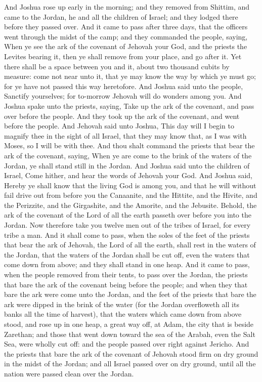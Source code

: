 And Joshua rose up early in the morning; and they removed from Shittim, and came to the Jordan, he and all the children of Israel; and they lodged there before they passed over. And it came to pass after three days, that the officers went through the midst of the camp; and they commanded the people, saying, When ye see the ark of the covenant of Jehovah your God, and the priests the Levites bearing it, then ye shall remove from your place, and go after it. Yet there shall be a space between you and it, about two thousand cubits by measure: come not near unto it, that ye may know the way by which ye must go; for ye have not passed this way heretofore. And Joshua said unto the people, Sanctify yourselves; for to-morrow Jehovah will do wonders among you. And Joshua spake unto the priests, saying, Take up the ark of the covenant, and pass over before the people. And they took up the ark of the covenant, and went before the people.  And Jehovah said unto Joshua, This day will I begin to magnify thee in the sight of all Israel, that they may know that, as I was with Moses, so I will be with thee. And thou shalt command the priests that bear the ark of the covenant, saying, When ye are come to the brink of the waters of the Jordan, ye shall stand still in the Jordan. And Joshua said unto the children of Israel, Come hither, and hear the words of Jehovah your God. And Joshua said, Hereby ye shall know that the living God is among you, and that he will without fail drive out from before you the Canaanite, and the Hittite, and the Hivite, and the Perizzite, and the Girgashite, and the Amorite, and the Jebusite. Behold, the ark of the covenant of the Lord of all the earth passeth over before you into the Jordan. Now therefore take you twelve men out of the tribes of Israel, for every tribe a man. And it shall come to pass, when the soles of the feet of the priests that bear the ark of Jehovah, the Lord of all the earth, shall rest in the waters of the Jordan, that the waters of the Jordan shall be cut off, even the waters that come down from above; and they shall stand in one heap.  And it came to pass, when the people removed from their tents, to pass over the Jordan, the priests that bare the ark of the covenant being before the people; and when they that bare the ark were come unto the Jordan, and the feet of the priests that bare the ark were dipped in the brink of the water (for the Jordan overfloweth all its banks all the time of harvest), that the waters which came down from above stood, and rose up in one heap, a great way off, at Adam, the city that is beside Zarethan; and those that went down toward the sea of the Arabah, even the Salt Sea, were wholly cut off: and the people passed over right against Jericho. And the priests that bare the ark of the covenant of Jehovah stood firm on dry ground in the midst of the Jordan; and all Israel passed over on dry ground, until all the nation were passed clean over the Jordan. 

